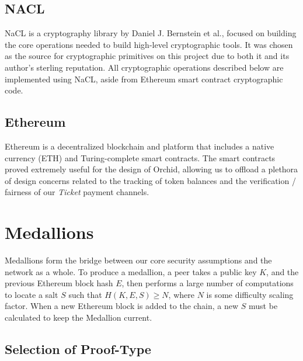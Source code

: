 \documentclass{article}
\newcommand{\orchid}{Orchid}
\newcommand{\Orchid}{\orchid}
\begin{document}
\subsection{NACL}

NaCL \cite{nacl} is a cryptography library by Daniel J. Bernstein et al., focused on building the core operations needed to build high-level cryptographic tools. It was chosen as the source for cryptographic primitives on this project due to both it and its author's sterling reputation. All cryptographic operations described below are implemented using NaCL, aside from Ethereum smart contract cryptographic code.

\subsection{Ethereum}

Ethereum \cite{29} is a decentralized blockchain and platform that includes a native currency (ETH) and Turing-complete smart contracts. The smart contracts proved extremely useful for the design of \Orchid, allowing us to offload a plethora of design concerns related to the tracking of token balances and the verification / fairness of our \emph{Ticket} payment channels.

\section{Medallions}
\label{medallions}

Medallions form the bridge between our core security assumptions and the network as a whole. To produce a medallion, a peer takes a public key $K$, and the previous Ethereum block hash $E$, then performs a large number of computations to locate a salt $S$ such that $H(K, E, S) \geq N$, where $N$ is some difficulty scaling factor. When a new Ethereum block is added to the chain, a new $S$ must be calculated to keep the Medallion current.


\subsection{Selection of Proof-Type}
\end{document}
